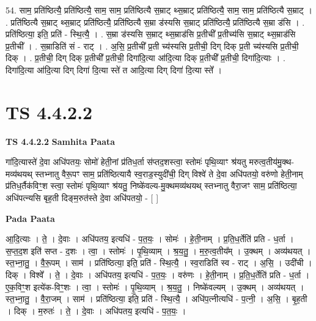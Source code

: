 \documentclass[17pt]{extarticle}
\begin{document}
54. साम॒ प्रति॑ष्ठित्यै॒ प्रति॑ष्ठित्यै॒ साम॒ साम॒ प्रति॑ष्ठित्यै स॒म्राट् थ्स॒म्राट् प्रति॑ष्ठित्यै॒ साम॒ साम॒ प्रति॑ष्ठित्यै स॒म्राट् । . प्रति॑ष्ठित्यै स॒म्राट् थ्स॒म्राट् प्रति॑ष्ठित्यै॒ प्रति॑ष्ठित्यै स॒म्रा ड॑स्यसि स॒म्राट् प्रति॑ष्ठित्यै॒ प्रति॑ष्ठित्यै स॒म्रा ड॑सि । . प्रति॑ष्ठित्या॒ इति॒ प्रति॑ - स्थि॒त्यै॒ । . स॒म्रा ड॑स्यसि स॒म्राट् थ्स॒म्राड॑सि प्र॒तीची᳚ प्र॒तीच्य॑सि स॒म्राट् थ्स॒म्राड॑सि प्र॒तीची᳚ । . स॒म्राडिति॑ सं - राट् । . अ॒सि॒ प्र॒तीची᳚ प्र॒ती च्य॑स्यसि प्र॒तीची॒ दिग् दिक् प्र॒ती च्य॑स्यसि प्र॒तीची॒ दिक् । . प्र॒तीची॒ दिग् दिक् प्र॒तीची᳚ प्र॒तीची॒ दिगा॑दि॒त्या आ॑दि॒त्या दिक् प्र॒तीची᳚ प्र॒तीची॒ दिगा॑दि॒त्याः । . दिगा॑दि॒त्या आ॑दि॒त्या दिग् दिगा॑ दि॒त्या स्ते॑ त आदि॒त्या दिग् दिगा॑ दि॒त्या स्ते᳚ । \newline
\pagebreak
{}

\section{ TS 4.4.2.2 }

\textbf{TS 4.4.2.2 } \newline
\textbf{Samhita Paata} \newline

गा॑दि॒त्यास्ते॑ दे॒वा अधि॑पतयः॒ सोमो॑ हेती॒नां प्र॑तिध॒र्ता स॑प्तद॒शस्त्वा॒ स्तोमः॑ पृथि॒व्याꣳ श्र॑यतु मरुत्व॒तीय॑मु॒क्थ-मव्य॑थयथ् स्तभ्नातु वैरू॒पꣳ साम॒ प्रति॑ष्ठित्यायै स्व॒राड॒स्युदी॑ची॒ दिग् विश्वे॑ ते दे॒वा अधि॑पतयो॒ वरु॑णो हेती॒नाम् प्र॑तिध॒र्तैक॑विꣳ॒॒श स्त्वा॒ स्तोमः॑ पृथि॒व्याꣳ श्र॑यतु॒ निष्के॑वल्य-मु॒क्थमव्य॑थयथ् स्तभ्नातु वैरा॒जꣳ साम॒ प्रति॑ष्ठित्या॒ अधि॑पत्न्यसि बृह॒ती दिङ्म॒रुत॑स्ते दे॒वा अधि॑पतयो॒ - [  ] \newline

\textbf{Pada Paata} \newline

आ॒दि॒त्याः । ते॒ । दे॒वाः । अधि॑पतय॒ इत्यधि॑ - प॒त॒यः॒ । सोमः॑ । हे॒ती॒नाम् । प्र॒ति॒ध॒र्तेति॑ प्रति - ध॒र्ता । स॒प्त॒द॒श इति॑ सप्त - द॒शः । त्वा॒ । स्तोमः॑ । पृ॒थि॒व्याम् । श्र॒य॒तु॒ । म॒रु॒त्व॒तीय᳚म् । उ॒क्थम् । अव्य॑थयत् । स्त॒भ्ना॒तु॒ । वै॒रू॒पम् । साम॑ । प्रति॑ष्ठित्या॒ इति॒ प्रति॑ - स्थि॒त्यै॒ । स्व॒राडिति॑ स्व - राट् । अ॒सि॒ । उदी॑ची । दिक् । विश्वे᳚ । ते॒ । दे॒वाः । अधि॑पतय॒ इत्यधि॑ - प॒त॒यः॒ । वरु॑णः । हे॒ती॒नाम् । प्र॒ति॒ध॒र्तेति॑ प्रति - ध॒र्ता । ए॒क॒विꣳ॒॒श इत्ये॑क-विꣳ॒॒शः । त्वा॒ । स्तोमः॑ । पृ॒थि॒व्याम् । श्र॒य॒तु॒ । निष्के॑वल्यम् । उ॒क्थम् । अव्य॑थयत् । स्त॒भ्ना॒तु॒ । वै॒रा॒जम् । साम॑ । प्रति॑ष्ठित्या॒ इति॒ प्रति॑ - स्थि॒त्यै॒ । अधि॑प॒त्नीत्यधि॑ - प॒त्नी॒ । अ॒सि॒ । बृ॒ह॒ती । दिक् । म॒रुतः॑ । ते॒ । दे॒वाः । अधि॑पतय॒ इत्यधि॑ - प॒त॒यः॒ ।  \newline
\end{document}
